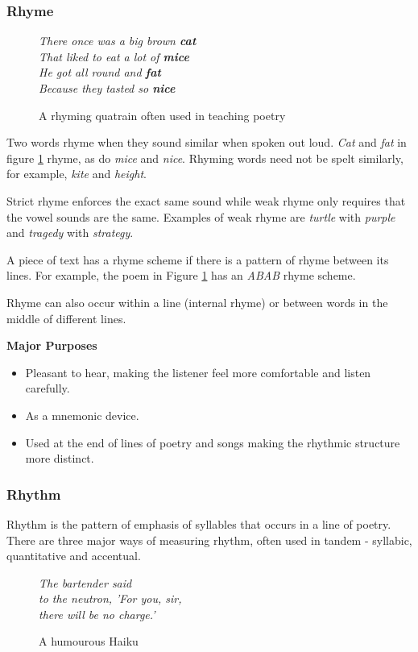 \subsubsection{Rhyme}
\label{sec:rhyme}

\begin{figure}[h!]
\centering
\textit{
There once was a big brown \textbf{cat}\\
That liked to eat a lot of \textbf{mice}\\
He got all round and \textbf{fat}\\
Because they tasted so \textbf{nice}
}
\caption{A rhyming quatrain often used in teaching poetry}
\label{fig:rhyme}
\end{figure}
Two words rhyme when they sound similar when spoken out loud. \textit{Cat} and \textit{fat} in figure \ref{fig:rhyme} rhyme, as do \textit{mice} and \textit{nice}. Rhyming words need not be spelt similarly, for example, \textit{kite} and \textit{height}. 

Strict rhyme enforces the exact same sound while weak rhyme only requires that the vowel sounds are the same. Examples of weak rhyme are \textit{turtle} with \textit{purple} and \textit{tragedy} with \textit{strategy}. 

A piece of text has a rhyme scheme if there is a pattern of rhyme between its lines. For example, the poem in Figure \ref{fig:rhyme} has an \textit{ABAB} rhyme scheme.

Rhyme can also occur within a line (internal rhyme) or between words in the middle of different lines.

\textbf{Major Purposes} 
\begin{itemize}
\item{Pleasant to hear, making the listener feel more comfortable and listen carefully.} 
\item{As a mnemonic device.}
\item{Used at the end of lines of poetry and songs making the rhythmic structure more distinct.}
\end{itemize}


\subsubsection{Rhythm}
\label{sec:rhythm}
Rhythm is the pattern of emphasis of syllables that occurs in a line of poetry. There are three major ways of measuring rhythm, often used in tandem - syllabic, quantitative and accentual.

\begin{figure}[h!]
\centering
\textit{
The bartender said\\
to the neutron, 'For you, sir,\\
there will be no charge.'\\
}
\caption{A humourous Haiku}
\label{fig:haiku}
\end{figure}


